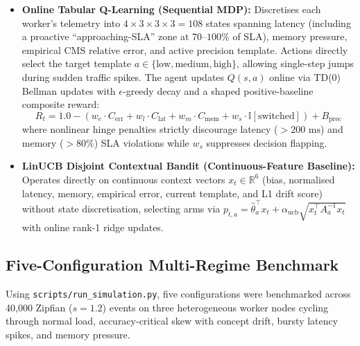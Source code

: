 \begin{itemize}
    \item \textbf{Online Tabular Q-Learning (Sequential MDP):} Discretises each worker's telemetry into $4 \times 3 \times 3 \times 3 = 108$ states spanning latency (including a proactive ``approaching-SLA'' zone at $70\text{--}100\%$ of SLA), memory pressure, empirical CMS relative error, and active precision template. Actions directly select the target template $a \in \{\text{low}, \text{medium}, \text{high}\}$, allowing single-step jumps during sudden traffic spikes. The agent updates $Q(s, a)$ online via TD(0) Bellman updates with $\epsilon$-greedy decay and a shaped positive-baseline composite reward:
    \begin{equation}
        R_t = 1.0 - \left(w_e \cdot C_{\text{err}} + w_l \cdot C_{\text{lat}} + w_m \cdot C_{\text{mem}} + w_s \cdot \mathbb{I}[\text{switched}]\right) + B_{\text{prec}}
    \end{equation}
    where nonlinear hinge penalties strictly discourage latency ($>200\text{ ms}$) and memory ($>80\%$) SLA violations while $w_s$ suppresses decision flapping.

    \item \textbf{LinUCB Disjoint Contextual Bandit (Continuous-Feature Baseline):} Operates directly on continuous context vectors $x_t \in \mathbb{R}^6$ (bias, normalised latency, memory, empirical error, current template, and L1 drift score) without state discretisation, selecting arms via $p_{t,a} = \hat{\theta}_a^\top x_t + \alpha_{\text{ucb}}\sqrt{x_t^\top A_a^{-1} x_t}$ with online rank-1 ridge updates.
\end{itemize}

\subsection{Five-Configuration Multi-Regime Benchmark}
Using \texttt{scripts/run\_simulation.py}, five configurations were benchmarked across 40,000 Zipfian ($s=1.2$) events on three heterogeneous worker nodes cycling through normal load, accuracy-critical skew with concept drift, bursty latency spikes, and memory pressure.

